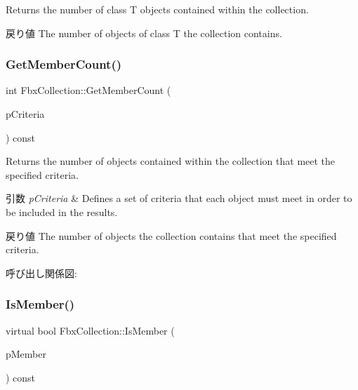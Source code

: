 Returns the number of class T objects contained within the collection. \begin{DoxyReturn}{戻り値}
The number of objects of class T the collection contains. 
\end{DoxyReturn}
\mbox{\label{class_fbx_collection_ab885c6a1cc7eb77b471ae11c65658258}} 
\subsubsection{\texorpdfstring{Get\+Member\+Count()}{GetMemberCount()}\hspace{0.1cm}{\footnotesize\ttfamily [3/3]}}
{\footnotesize\ttfamily int Fbx\+Collection\+::\+Get\+Member\+Count (\begin{DoxyParamCaption}\item[{const \hyperlink{class_fbx_criteria}{Fbx\+Criteria} \&}]{p\+Criteria }\end{DoxyParamCaption}) const}

Returns the number of objects contained within the collection that meet the specified criteria. 
\begin{DoxyParams}{引数}
{\em p\+Criteria} & Defines a set of criteria that each object must meet in order to be included in the results. \\
\hline
\end{DoxyParams}
\begin{DoxyReturn}{戻り値}
The number of objects the collection contains that meet the specified criteria. 
\end{DoxyReturn}
呼び出し関係図\+:
\mbox{\label{class_fbx_collection_a988fd0dcbe61e4b9b165d6830543f49e}} 
\subsubsection{\texorpdfstring{Is\+Member()}{IsMember()}}
{\footnotesize\ttfamily virtual bool Fbx\+Collection\+::\+Is\+Member (\begin{DoxyParamCaption}\item[{const \hyperlink{class_fbx_object}{Fbx\+Object} $\ast$}]{p\+Member }\end{DoxyParamCaption}) const\hspace{0.3cm}{\ttfamily [virtual]}}

